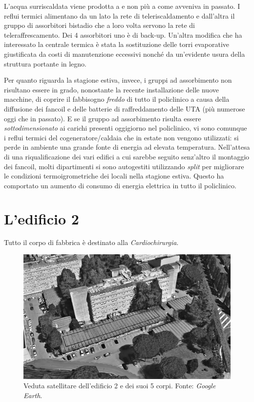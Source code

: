 L'acqua surriscaldata viene prodotta a  e non più a  come avveniva in passato. I reflui termici alimentano da un lato la rete di teleriscaldamento e dall'altra il gruppo di assorbitori bistadio che a loro volta servono la rete di teleraffrescamento. Dei \num{4} assorbitori uno è di back-up. Un'altra modifica che ha interessato la centrale termica è stata la sostituzione delle torri evaporative giustificata da costi di manutenzione eccessivi nonché da un'evidente usura della struttura portante in legno. 

Per quanto riguarda la stagione estiva, invece, i gruppi ad assorbimento non risultano essere in grado, nonostante la recente installazione delle nuove macchine, di coprire il fabbisogno \emph{freddo} di tutto il policlinico a causa della diffusione dei fancoil e delle batterie di raffreddamento delle UTA (più numerose oggi che in passato). E se il gruppo ad assorbimento risulta essere \emph{sottodimensionato} ai carichi presenti oggigiorno nel policlinico, vi sono comunque i reflui termici del cogeneratore/caldaia che in estate non vengono utilizzati: si perde in ambiente una grande fonte di energia ad elevata temperatura. Nell'attesa di una riqualificazione dei vari edifici a cui sarebbe seguito senz'altro il montaggio dei fancoil, molti dipartimenti si sono autogestiti utilizzando \emph{split} per migliorare le condizioni termoigrometriche dei locali nella stagione estiva. Questo ha comportato un aumento di consumo di energia elettrica in tutto il policlinico.

\section{L'edificio 2}
Tutto il corpo di fabbrica è destinato alla \emph{Cardiochirurgia}.
\begin{figure}[t]
	\centering
	\includegraphics[width=\textwidth]{6_2_cap/img/SatellitareED2}
	\caption[Veduta satellitare dell'edificio 2 e dei suoi 5 corpi]{Veduta satellitare dell'edificio 2 e dei suoi 5 corpi. Fonte: \emph{Google Earth}.}
\end{figure}

